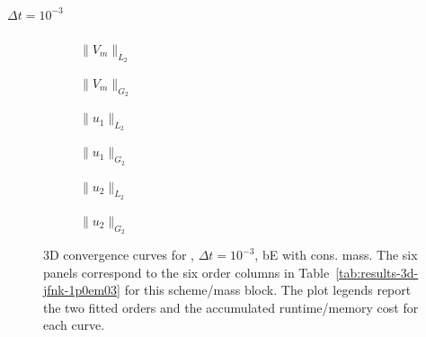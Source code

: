 \paragraph{$\Delta t=10^{-3}$}

\begin{figure}[p]
\centering
\begin{subfigure}{0.485\linewidth}
\centering
{}
\caption{$\|V_m\|_{L_2}$}
\label{fig:results-3d-jfnk-1p0em03-backwardeuler-consistent-a}
\end{subfigure}
\hfill
\begin{subfigure}{0.485\linewidth}
\centering
{}
\caption{$\|V_m\|_{G_2}$}
\label{fig:results-3d-jfnk-1p0em03-backwardeuler-consistent-b}
\end{subfigure}
\par\vspace{0.8em}
\begin{subfigure}{0.485\linewidth}
\centering
{}
\caption{$\|u_1\|_{L_2}$}
\label{fig:results-3d-jfnk-1p0em03-backwardeuler-consistent-c}
\end{subfigure}
\hfill
\begin{subfigure}{0.485\linewidth}
\centering
{}
\caption{$\|u_1\|_{G_2}$}
\label{fig:results-3d-jfnk-1p0em03-backwardeuler-consistent-d}
\end{subfigure}
\par\vspace{0.8em}
\begin{subfigure}{0.485\linewidth}
\centering
{}
\caption{$\|u_2\|_{L_2}$}
\label{fig:results-3d-jfnk-1p0em03-backwardeuler-consistent-e}
\end{subfigure}
\hfill
\begin{subfigure}{0.485\linewidth}
\centering
{}
\caption{$\|u_2\|_{G_2}$}
\label{fig:results-3d-jfnk-1p0em03-backwardeuler-consistent-f}
\end{subfigure}
\caption{3D convergence curves for , $\Delta t=10^{-3}$, bE with cons. mass. The six panels correspond to the six order columns in Table~\ref{tab:results-3d-jfnk-1p0em03} for this scheme/mass block. The plot legends report the two fitted orders and the accumulated runtime/memory cost for each curve.}
\label{fig:results-3d-jfnk-1p0em03-backwardeuler-consistent}
\end{figure}
\FloatBarrier

